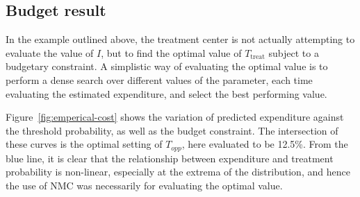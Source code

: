 \subsection{Budget result}
\label{sec:cancer_sim_result}

In the example outlined above, the treatment center is not actually attempting to evaluate the value of $I$, but to find the optimal value of $T_{\text{treat}}$ subject to a budgetary constraint. A simplistic way of evaluating the optimal value is to perform a dense search over different values of the parameter, each time evaluating the estimated expenditure, and select the best performing value.

Figure~\ref{fig:emperical-cost} shows the variation of predicted expenditure against the threshold probability, as well as the budget constraint. The intersection of these curves is the optimal setting of $T_{opp}$, here evaluated to be 12.5\%. From the blue line, it is clear that the relationship between expenditure and treatment probability is non-linear, especially at the extrema of the distribution, and hence the use of NMC was necessarily for evaluating the optimal value. 


